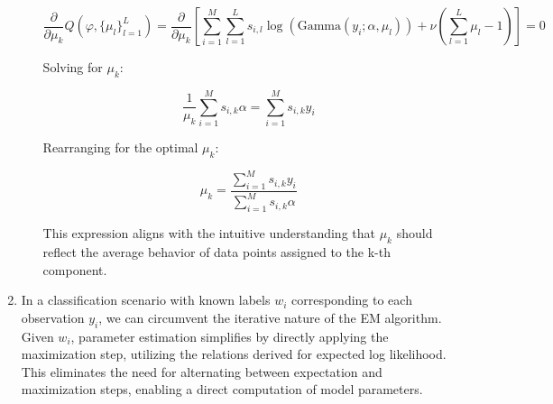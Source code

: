 \documentclass[submit]{harvardml}
\begin{document}
\begin{enumerate}
\begin{enumerate}
\begin{equation}
    \frac{\partial}{\partial \mu_k} Q(\varphi, \{\mu_l\}_{l=1}^L) = \frac{\partial}{\partial \mu_k} \left[ \sum_{i=1}^M \sum_{l=1}^L s_{i,l} \log(\text{Gamma}(y_i; \alpha, \mu_l)) + \nu \left( \sum_{l=1}^L \mu_l - 1 \right) \right] = 0
\end{equation}

Solving for \( \mu_k \):

\begin{equation}
    \frac{1}{\mu_k} \sum_{i=1}^M s_{i,k} \alpha = \sum_{i=1}^M s_{i,k} y_i
\end{equation}

Rearranging for the optimal \( \mu_k \):

\begin{equation}
    \mu_k = \frac{\sum_{i=1}^M s_{i,k} y_i}{\sum_{i=1}^M s_{i,k} \alpha}
\end{equation}

This expression aligns with the intuitive understanding that \( \mu_k \) should reflect the average behavior of data points assigned to the k-th component.

  \end{enumerate}
  \item In a classification scenario with known labels \( w_i \) corresponding to each observation \( y_i \), we can circumvent the iterative nature of the EM algorithm. Given \( w_i \), parameter estimation simplifies by directly applying the maximization step, utilizing the relations derived for expected log likelihood. This eliminates the need for alternating between expectation and maximization steps, enabling a direct computation of model parameters.

\end{enumerate}


\newpage
\end{document}
